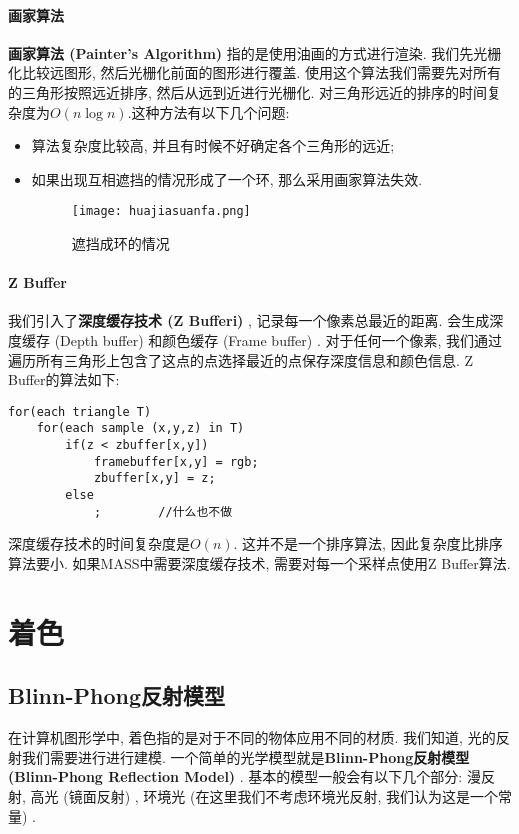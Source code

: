 \documentclass[openany]{progbookcn}
\begin{document}
\subsection{画家算法}
\textbf{画家算法 (Painter's Algorithm) }指的是使用油画的方式进行渲染. 我们先光栅化比较远图形, 然后光栅化前面的图形进行覆盖. 使用这个算法我们需要先对所有的三角形按照远近排序, 然后从远到近进行光栅化. 对三角形远近的排序的时间复杂度为$O(n\log n)$.这种方法有以下几个问题: 
\begin{itemize}
	\item 算法复杂度比较高, 并且有时候不好确定各个三角形的远近; 
	\item 如果出现互相遮挡的情况形成了一个环, 那么采用画家算法失效. 
	\begin{figure}[H]
		\centering
		\texttt{[image: huajiasuanfa.png]}
		\caption{遮挡成环的情况}
		\label{fig:zhedang}
	\end{figure}
	
\end{itemize}

\subsection{Z Buffer}
我们引入了\textbf{深度缓存技术 (Z Bufferi) }, 记录每一个像素总最近的距离. 会生成深度缓存 (Depth buffer) 和颜色缓存 (Frame buffer) . 对于任何一个像素, 我们通过遍历所有三角形上包含了这点的点选择最近的点保存深度信息和颜色信息. 
Z Buffer的算法如下: 
\begin{lstlisting}
for(each triangle T)
	for(each sample (x,y,z) in T)
		if(z < zbuffer[x,y])
			framebuffer[x,y] = rgb;
			zbuffer[x,y] = z;
		else
			;        //什么也不做
\end{lstlisting}
深度缓存技术的时间复杂度是$O(n)$. 这并不是一个排序算法, 因此复杂度比排序算法要小. 如果MASS中需要深度缓存技术, 需要对每一个采样点使用Z Buffer算法. 

\part{着色}

\chapter{Blinn-Phong反射模型}
在计算机图形学中, 着色指的是对于不同的物体应用不同的材质. 我们知道, 光的反射我们需要进行进行建模. 一个简单的光学模型就是\textbf{Blinn-Phong反射模型 (Blinn-Phong Reflection Model) }. 基本的模型一般会有以下几个部分: 漫反射, 高光 (镜面反射) , 环境光 (在这里我们不考虑环境光反射, 我们认为这是一个常量) . 
\end{document}
